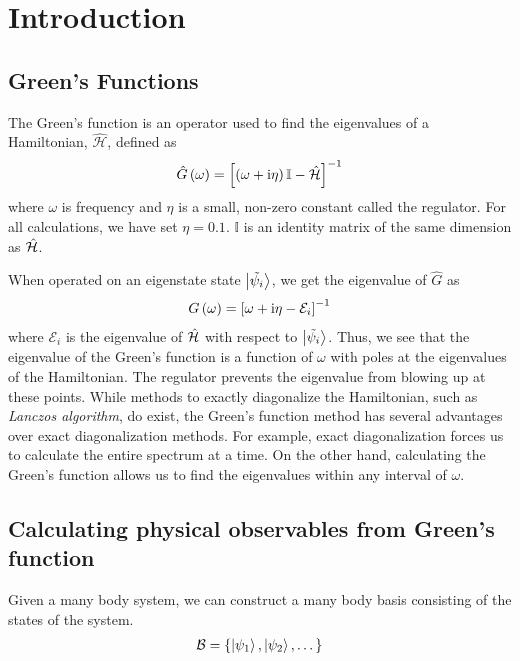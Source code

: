 \chapter{\label{intro}Introduction}

\setcounter{equation}{0}
\setcounter{table}{0}
\setcounter{figure}{0}

\section{Green's Functions}
	The Green's function is an operator used to find the eigenvalues of a  Hamiltonian, $ \hat{\mathcal{H}} $, defined as
	\begin{align}
		\hat{G}\left(\omega\right) = \left[ \left( \omega + \mathrm{i} \eta\right) \mathbb{I} - \hat{\mathcal{H}} \right]^{-1}
	\end{align}
	where $ \omega $ is frequency and $ \eta $ is a small, non-zero constant called the regulator. For all calculations, we have set $ \eta = 0.1 $. $ \mathbb{I} $ is an identity matrix of the same dimension as $ \hat{\mathcal{H}} $.
	
	When operated on an eigenstate state $ \ket{\tilde{\psi_i}} $, we get the eigenvalue of $ \hat{G} $ as
	\begin{align}
		G\left(\omega\right) = \left[ \omega + \mathrm{i} \eta - \mathcal{E}_i \right]^{-1}
	\end{align}
	where $ \mathcal{E}_i $ is the eigenvalue of $ \hat{\mathcal{H}} $ with respect to $ \ket{\tilde{\psi_i}} $. Thus, we see that the eigenvalue of the Green's function is a function of $ \omega $ with poles at the eigenvalues of the Hamiltonian. The regulator prevents the eigenvalue from blowing up at these points. While methods to exactly diagonalize the Hamiltonian, such as \textit{Lanczos algorithm}, do exist, the Green's function method has several advantages over exact diagonalization methods. For example, exact diagonalization forces us to calculate the entire spectrum at a time. On the other hand, calculating the Green's function allows us to find the eigenvalues within any interval of $\omega$.
    
\section{Calculating physical observables from Green's function}
	Given a many body system, we can construct a many body basis consisting of the states of the system.
	\begin{align}
		\mathcal{B} = \{ \ket{\psi_1}, \ket{\psi_2}, \dots \}
	\end{align} 
	
